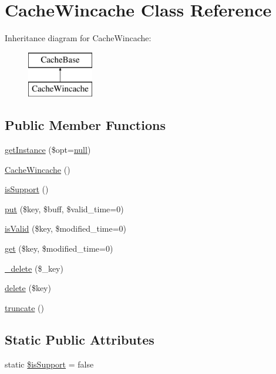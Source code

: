 \hypertarget{classCacheWincache}{}\section{Cache\+Wincache Class Reference}
\label{classCacheWincache}
Inheritance diagram for Cache\+Wincache\+:\begin{figure}[H]
\begin{center}
\leavevmode
\includegraphics[height=2.000000cm]{classCacheWincache}
\end{center}
\end{figure}
\subsection*{Public Member Functions}
\begin{DoxyCompactItemize}
\item 
\hyperlink{classCacheWincache_a4de3bb419825ceebbfbe5374cd144e07}{get\+Instance} (\$opt=\hyperlink{modernizr_8min_8js_a286f9ec831c5e676eeb493248eab9575}{null})
\item 
\hyperlink{classCacheWincache_a564e8c74dc22b1e84a0d1cfd6d0d935e}{Cache\+Wincache} ()
\item 
\hyperlink{classCacheWincache_a816994c866a29c5c7b117996de2f513c}{is\+Support} ()
\item 
\hyperlink{classCacheWincache_a1302d9ee0f33efefc8c690a9a9a5f9e1}{put} (\$key, \$buff, \$valid\+\_\+time=0)
\item 
\hyperlink{classCacheWincache_af8d27de13a90149d523c59dc589d2c15}{is\+Valid} (\$key, \$modified\+\_\+time=0)
\item 
\hyperlink{classCacheWincache_a36123121cdf50235b64929c3a13b596b}{get} (\$key, \$modified\+\_\+time=0)
\item 
\hyperlink{classCacheWincache_ab20145a0ee5672f182b6da797c80b77a}{\+\_\+delete} (\$\+\_\+key)
\item 
\hyperlink{classCacheWincache_ae7bfddf70b319e76b50f06d50ec720a2}{delete} (\$key)
\item 
\hyperlink{classCacheWincache_a2da6969290f8ded04554bfaddce5825d}{truncate} ()
\end{DoxyCompactItemize}
\subsection*{Static Public Attributes}
\begin{DoxyCompactItemize}
\item 
static \hyperlink{classCacheWincache_a633cb53cf9535236075169604bf363e3}{\$is\+Support} = false
\end{DoxyCompactItemize}
